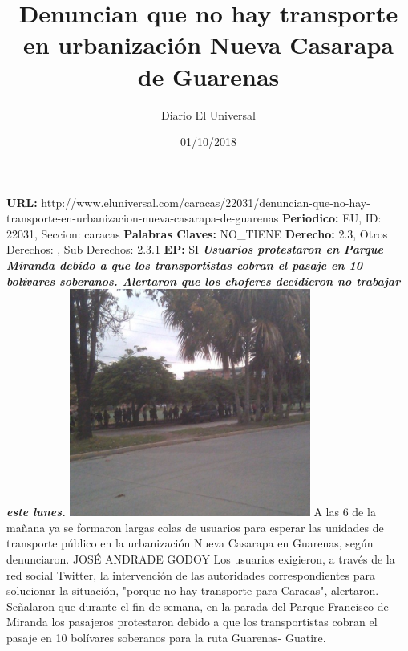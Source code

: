 \documentclass{article}%
\title{\textbf{Denuncian que no hay transporte en urbanización Nueva Casarapa de Guarenas}}%
\author{Diario El Universal}%
\date{01/10/2018}%
\begin{document}
%
\normalsize%
\maketitle%
\textbf{URL: }%
http://www.eluniversal.com/caracas/22031/denuncian{-}que{-}no{-}hay{-}transporte{-}en{-}urbanizacion{-}nueva{-}casarapa{-}de{-}guarenas\newline%
%
\textbf{Periodico: }%
EU, %
ID: %
22031, %
Seccion: %
caracas\newline%
%
\textbf{Palabras Claves: }%
NO\_TIENE\newline%
%
\textbf{Derecho: }%
2.3, %
Otros Derechos: %
, %
Sub Derechos: %
2.3.1\newline%
%
\textbf{EP: }%
SI\newline%
\newline%
%
\textbf{\textit{Usuarios protestaron en Parque Miranda debido a que los transportistas cobran el pasaje en 10 bolívares soberanos. Alertaron que los choferes decidieron no trabajar este lunes.}}%
\newline%
\newline%
%
\includegraphics[width=300px]{62.jpg}%
\newline%
%
A las 6 de la mañana ya se formaron largas colas de usuarios para esperar las unidades de transporte público en la urbanización Nueva Casarapa en Guarenas, según denunciaron.%
\newline%
%
JOSÉ ANDRADE GODOY%
\newline%
%
Los usuarios exigieron, a través de la red social Twitter, la intervención de las autoridades correspondientes para solucionar la situación, "porque no hay transporte para Caracas", alertaron.%
\newline%
%
Señalaron que durante el fin de semana, en la parada del Parque Francisco de Miranda los pasajeros protestaron debido a que los transportistas cobran el pasaje en 10 bolívares soberanos para la ruta Guarenas{-} Guatire.%
\newline%
%
\end{document}
